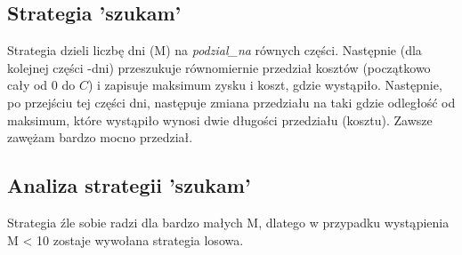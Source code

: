 \documentclass{article}
\begin{document}
\subsection{Strategia 'szukam'}
Strategia dzieli liczbę dni (M) na \textit{podzial\_na} równych części. Następnie (dla kolejnej części -dni) 
przeszukuje równomiernie przedział kosztów (początkowo cały od $0$ do $C$) i zapisuje maksimum zysku i koszt, gdzie wystąpiło.
Następnie, po przejściu tej części dni, następuje zmiana przedziału na taki gdzie odległość od maksimum, które wystąpiło
wynosi dwie długości przedziału (kosztu). Zawsze zawężam bardzo mocno przedział.
\subsection{Analiza strategii 'szukam'}
Strategia źle sobie radzi dla bardzo małych M, dlatego w przypadku wystąpienia M < 10 zostaje wywołana strategia losowa.
\end{document}
